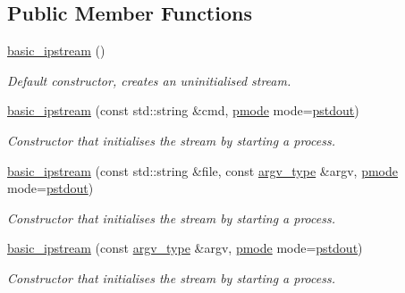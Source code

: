 \subsection*{Public Member Functions}
\begin{DoxyCompactItemize}
\item 
\mbox{\label{classredi_1_1basic__ipstream_a74223c8486e0f59c18f706af416dc616}} 
\mbox{\hyperlink{classredi_1_1basic__ipstream_a74223c8486e0f59c18f706af416dc616}{basic\+\_\+ipstream}} ()
\begin{DoxyCompactList}\small\item\em Default constructor, creates an uninitialised stream. \end{DoxyCompactList}\item 
\mbox{\hyperlink{classredi_1_1basic__ipstream_ac9abde4c112c0d8e6680a6e78f9040f9}{basic\+\_\+ipstream}} (const std\+::string \&cmd, \mbox{\hyperlink{structredi_1_1pstreams_a1eae4aad88812af03a0fbb3ec13c50b7}{pmode}} mode=\mbox{\hyperlink{structredi_1_1pstreams_ad3c6d53a98de4566478b1c40c101a42b}{pstdout}})
\begin{DoxyCompactList}\small\item\em Constructor that initialises the stream by starting a process. \end{DoxyCompactList}\item 
\mbox{\hyperlink{classredi_1_1basic__ipstream_a5aac4d83300cfca6dfcdf6632c900a4d}{basic\+\_\+ipstream}} (const std\+::string \&file, const \mbox{\hyperlink{structredi_1_1pstreams_af902b894b095c1875e96c10129489467}{argv\+\_\+type}} \&argv, \mbox{\hyperlink{structredi_1_1pstreams_a1eae4aad88812af03a0fbb3ec13c50b7}{pmode}} mode=\mbox{\hyperlink{structredi_1_1pstreams_ad3c6d53a98de4566478b1c40c101a42b}{pstdout}})
\begin{DoxyCompactList}\small\item\em Constructor that initialises the stream by starting a process. \end{DoxyCompactList}\item 
\mbox{\hyperlink{classredi_1_1basic__ipstream_a6a7ac02dc687d8143dbe64c50f2d82d6}{basic\+\_\+ipstream}} (const \mbox{\hyperlink{structredi_1_1pstreams_af902b894b095c1875e96c10129489467}{argv\+\_\+type}} \&argv, \mbox{\hyperlink{structredi_1_1pstreams_a1eae4aad88812af03a0fbb3ec13c50b7}{pmode}} mode=\mbox{\hyperlink{structredi_1_1pstreams_ad3c6d53a98de4566478b1c40c101a42b}{pstdout}})
\begin{DoxyCompactList}\small\item\em Constructor that initialises the stream by starting a process. \end{DoxyCompactList}\item 

\end{DoxyCompactItemize}
